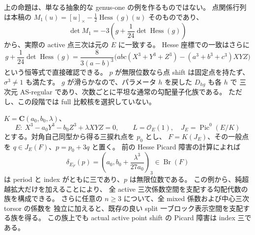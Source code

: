 \begin{remark}[実現の範囲]
上の命題は、単なる抽象的な genus-one の例を作るものではない。
点関係行列は本稿の
$M_1(u)=[u]_\times-\frac12\operatorname{Hess}(g)(u)$ そのものであり、
\[
 \det M_1=-3\left(g+\frac1{24}\det\operatorname{Hess}(g)\right)
\]
から、実際の active 点三次は元の $E$ に一致する。
Hesse 座標での一致はさらに
\[
 g+\frac1{24}\det\operatorname{Hess}(g)
 =\frac{8}{3(a-b)^3}
 \bigl(abc(X^3+Y^3+Z^3)-(a^3+b^3+c^3)XYZ\bigr)
\]
という恒等式で直接確認できる。
$p$ が無限位数なら点 shift は固定点を持たず、$\sigma^3\ne1$ も満たす。
$g$ が滑らかなので、パラメータ $h$ を戻した $D_{hg}$ も各 $h$ で
三次元 AS-regular であり、次数ごとに平坦な通常の勾配量子化族である。
ただし、この段階では full 比較核を選択していない。
\end{remark}

\begin{proposition}[非零点障害を保つ支配的な表示族]
\label{prop:nfm-active-point-obstruction-dominant}
$K=\mathbf C(a_0,b_0,\lambda)$、
\[
 E:\ X^3-a_0Y^3-b_0Z^3+\lambda XYZ=0,
 \qquad L=\mathcal O_E(1),\quad J_E=\operatorname{Pic}^0(E/K)
\]
とする。対角自己同型から得る三捩れ点を $p_0$ とし、
$F=K(J_E)$、その一般点を $q\in J_E(F)$、$p=p_0+3q$ と置く。
前の Hesse Picard 障害の計算によれば
\[
 \delta_{E_F}(p)
   =\left(a_0,b_0+\frac{\lambda^3}{27a_0}\right)_3
   \in\operatorname{Br}(F)
\]
は period と index がともに三であり、$p$ は無限位数である。
この例から、純超越拡大だけを加えることにより、
全 active 三次係数空間を支配する勾配代数の族を構成できる。
さらに任意の $n\ge3$ について、全 mixed 係数および中心三次 torsor の係数を
独立に加えると、既存の良い split 一ブロック表示空間を支配する族を得る。
この族上でも actual active point shift の Picard 障害は index 三である。
\end{proposition}

